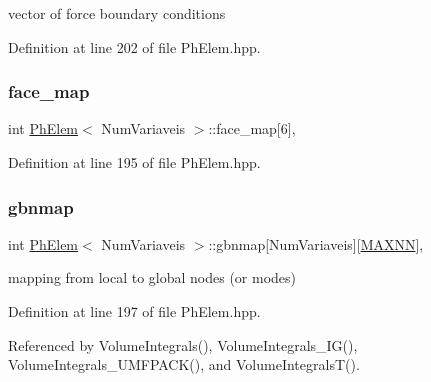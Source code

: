 vector of force boundary conditions 



Definition at line 202 of file Ph\+Elem.\+hpp.

\mbox{\label{classPhElem_a300b484c07390b9016d9ed97980d76b3}} 
\subsubsection{\texorpdfstring{face\+\_\+map}{face\_map}}
{\footnotesize\ttfamily int \hyperlink{classPhElem}{Ph\+Elem}$<$ Num\+Variaveis $>$\+::face\+\_\+map\mbox{[}6\mbox{]}\hspace{0.3cm}{\ttfamily [protected]}, {\ttfamily [inherited]}}



Definition at line 195 of file Ph\+Elem.\+hpp.

\mbox{\label{classPhElem_ab27e9040a72ec923a90cffb25f5b0c15}} 
\subsubsection{\texorpdfstring{gbnmap}{gbnmap}}
{\footnotesize\ttfamily int \hyperlink{classPhElem}{Ph\+Elem}$<$ Num\+Variaveis $>$\+::gbnmap\mbox{[}Num\+Variaveis\mbox{]}\mbox{[}\hyperlink{MyOptions_8h_a2f91e7a0b4bf68a62a0f3d38904dea2c}{M\+A\+X\+NN}\mbox{]}\hspace{0.3cm}{\ttfamily [protected]}, {\ttfamily [inherited]}}



mapping from local to global nodes (or modes) 



Definition at line 197 of file Ph\+Elem.\+hpp.



Referenced by Volume\+Integrals(), Volume\+Integrals\+\_\+\+I\+G(), Volume\+Integrals\+\_\+\+U\+M\+F\+P\+A\+C\+K(), and Volume\+Integrals\+T().

\mbox{\label{classPhElem_a8188f64662092eb065a85d49f3ae6649}} 
